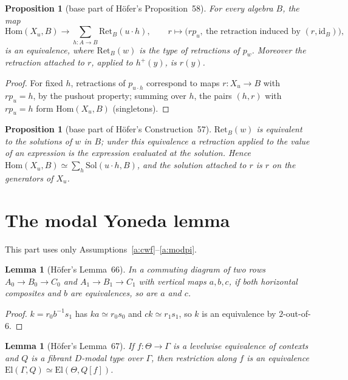 \documentclass[11pt]{amsart}
\newtheorem{proposition}[theorem]{Proposition}
\newtheorem{lemma}[theorem]{Lemma}
\theoremstyle{definition}
\theoremstyle{remark}
\newcommand{\El}{\mathrm{El}}
\newcommand{\Hom}{\mathrm{Hom}}
\newcommand{\Sol}{\mathrm{Sol}}
\newcommand{\Ret}{\mathrm{Ret}}
\begin{document}
\begin{proposition}[base part of H\"ofer's Proposition~58]\label{prop:rep}
For every algebra $B$, the map
\[
\Hom(X_u,B) \longrightarrow \textstyle\sum_{h\colon A\to B}\Ret_B(u\cdot h),
\qquad r\mapsto \bigl(r p_u,\ \text{the retraction induced by }(r,\mathrm{id}_B)\bigr),
\]
is an equivalence, where $\Ret_B(w)$ is the type of retractions of $p_w$.
Moreover the retraction attached to $r$, applied to $h^+(y)$, is $r(y)$.
\end{proposition}

\begin{proof}
For fixed $h$, retractions of $p_{u\cdot h}$ correspond to maps
$r\colon X_u\to B$ with $r p_u=h$, by the pushout property; summing over
$h$, the pairs $(h,r)$ with $r p_u = h$ form $\Hom(X_u,B)$ (singletons).
\end{proof}

\begin{proposition}[base part of H\"ofer's Construction~57]\label{prop:points}
$\Ret_B(w)$ is equivalent to the solutions of $w$ in $B$; under this
equivalence a retraction applied to the value of an expression is the
expression evaluated at the solution. Hence
$\Hom(X_u,B)\simeq\sum_h \Sol(u\cdot h, B)$, and the solution attached to
$r$ is $r$ on the generators of $X_u$.
\end{proposition}

\section{The modal Yoneda lemma}\label{sec:yoneda}

This part uses only Assumptions~\ref{a:cwf}--\ref{a:modpi}.

\begin{lemma}[H\"ofer's Lemma~66]\label{lem:66}
In a commuting diagram of two rows $A_0\to B_0\to C_0$ and $A_1\to B_1\to
C_1$ with vertical maps $a,b,c$, if both horizontal composites and $b$ are
equivalences, so are $a$ and $c$.
\end{lemma}

\begin{proof}
$k = r_0 b^{-1} s_1$ has $k a\simeq r_0 s_0$ and $c k\simeq r_1 s_1$, so
$k$ is an equivalence by $2$-out-of-$6$.
\end{proof}

\begin{lemma}[H\"ofer's Lemma~67]\label{lem:67}
If $f\colon\Theta\to\Gamma$ is a levelwise equivalence of contexts and $Q$
is a fibrant $D$-modal type over $\Gamma$, then restriction along $f$ is an
equivalence $\El(\Gamma,Q)\simeq\El(\Theta,Q[f])$.
\end{lemma}
\end{document}

